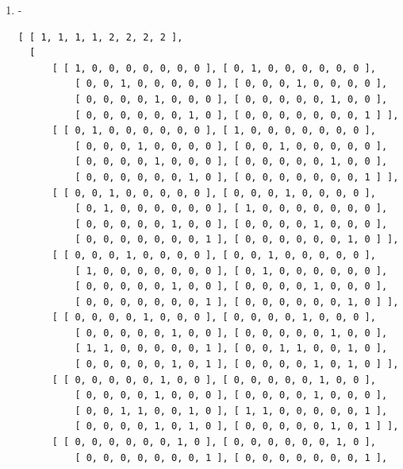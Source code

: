 \documentclass[a4paper, 10pt]{book}
\theoremstyle{definition}
\numberwithin{equation}{chapter}
\begin{document}
\begin{appendices}
\begin{enumerate}
\begin{lstlisting}[numbers=none]
          [ 0, 1, 0, 0, 0, 0, 0, 0, 0, 0 ], [ 1, 0, 0, 0, 0, 0, 0, 0, 0, 0 ],
          [ 0, 0, 1, 0, 0, 0, 0, 0, 0, 0 ], [ 0, 0, 0, 0, 0, 1, 0, 0, 0, 0 ],
          [ 0, 0, 0, 0, 0, 0, 1, 0, 0, 0 ], [ 0, 0, 0, 0, 1, 0, 0, 0, 0, 0 ] 
         ], 
      [ [ 0, 0, 0, 0, 0, 0, 0, 0, 0, 1 ], [ 0, 0, 0, 0, 0, 0, 0, 0, 1, 0 ], 
          [ 0, 0, 0, 0, 0, 0, 0, 1, 0, 0 ], [ 0, 0, 0, 1, 0, 0, 0, 0, 0, 0 ],
          [ 1, 0, 0, 0, 0, 0, 0, 0, 0, 0 ], [ 0, 0, 1, 0, 0, 0, 0, 0, 0, 0 ],
          [ 0, 1, 0, 0, 0, 0, 0, 0, 0, 0 ], [ 0, 0, 0, 0, 0, 0, 1, 0, 0, 0 ],
          [ 0, 0, 0, 0, 1, 0, 0, 0, 0, 0 ], [ 0, 0, 0, 0, 0, 1, 0, 0, 0, 0 ] 
         ] ] ]
	\end{lstlisting}
	\item -\begin{lstlisting}[numbers=none]
	[ [ 1, 1, 1, 1, 2, 2, 2, 2 ], 
  [ 
      [ [ 1, 0, 0, 0, 0, 0, 0, 0 ], [ 0, 1, 0, 0, 0, 0, 0, 0 ], 
          [ 0, 0, 1, 0, 0, 0, 0, 0 ], [ 0, 0, 0, 1, 0, 0, 0, 0 ], 
          [ 0, 0, 0, 0, 1, 0, 0, 0 ], [ 0, 0, 0, 0, 0, 1, 0, 0 ], 
          [ 0, 0, 0, 0, 0, 0, 1, 0 ], [ 0, 0, 0, 0, 0, 0, 0, 1 ] ], 
      [ [ 0, 1, 0, 0, 0, 0, 0, 0 ], [ 1, 0, 0, 0, 0, 0, 0, 0 ], 
          [ 0, 0, 0, 1, 0, 0, 0, 0 ], [ 0, 0, 1, 0, 0, 0, 0, 0 ], 
          [ 0, 0, 0, 0, 1, 0, 0, 0 ], [ 0, 0, 0, 0, 0, 1, 0, 0 ], 
          [ 0, 0, 0, 0, 0, 0, 1, 0 ], [ 0, 0, 0, 0, 0, 0, 0, 1 ] ], 
      [ [ 0, 0, 1, 0, 0, 0, 0, 0 ], [ 0, 0, 0, 1, 0, 0, 0, 0 ], 
          [ 0, 1, 0, 0, 0, 0, 0, 0 ], [ 1, 0, 0, 0, 0, 0, 0, 0 ], 
          [ 0, 0, 0, 0, 0, 1, 0, 0 ], [ 0, 0, 0, 0, 1, 0, 0, 0 ], 
          [ 0, 0, 0, 0, 0, 0, 0, 1 ], [ 0, 0, 0, 0, 0, 0, 1, 0 ] ], 
      [ [ 0, 0, 0, 1, 0, 0, 0, 0 ], [ 0, 0, 1, 0, 0, 0, 0, 0 ], 
          [ 1, 0, 0, 0, 0, 0, 0, 0 ], [ 0, 1, 0, 0, 0, 0, 0, 0 ], 
          [ 0, 0, 0, 0, 0, 1, 0, 0 ], [ 0, 0, 0, 0, 1, 0, 0, 0 ], 
          [ 0, 0, 0, 0, 0, 0, 0, 1 ], [ 0, 0, 0, 0, 0, 0, 1, 0 ] ], 
      [ [ 0, 0, 0, 0, 1, 0, 0, 0 ], [ 0, 0, 0, 0, 1, 0, 0, 0 ], 
          [ 0, 0, 0, 0, 0, 1, 0, 0 ], [ 0, 0, 0, 0, 0, 1, 0, 0 ], 
          [ 1, 1, 0, 0, 0, 0, 0, 1 ], [ 0, 0, 1, 1, 0, 0, 1, 0 ], 
          [ 0, 0, 0, 0, 0, 1, 0, 1 ], [ 0, 0, 0, 0, 1, 0, 1, 0 ] ], 
      [ [ 0, 0, 0, 0, 0, 1, 0, 0 ], [ 0, 0, 0, 0, 0, 1, 0, 0 ], 
          [ 0, 0, 0, 0, 1, 0, 0, 0 ], [ 0, 0, 0, 0, 1, 0, 0, 0 ], 
          [ 0, 0, 1, 1, 0, 0, 1, 0 ], [ 1, 1, 0, 0, 0, 0, 0, 1 ], 
          [ 0, 0, 0, 0, 1, 0, 1, 0 ], [ 0, 0, 0, 0, 0, 1, 0, 1 ] ], 
      [ [ 0, 0, 0, 0, 0, 0, 1, 0 ], [ 0, 0, 0, 0, 0, 0, 1, 0 ], 
          [ 0, 0, 0, 0, 0, 0, 0, 1 ], [ 0, 0, 0, 0, 0, 0, 0, 1 ], 

\end{lstlisting}
\end{enumerate}
\end{appendices}
\end{document}
